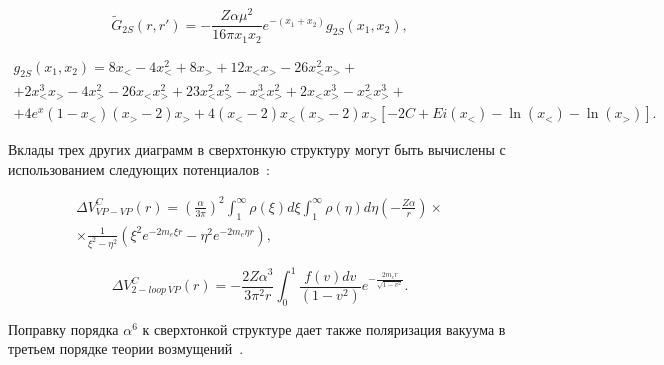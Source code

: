 \begin{equation}

\label{eq:green2s}

\tilde G_{2S}(r,r')=-\frac{Z\alpha\mu^2}{16\pi x_1x_2}e^{-(x_1+x_2)}g_{2S}(x_1,x_2),

\end{equation}

\begin{multline}

g_{2S}(x_1,x_2)=8x_{<}-4x^2_{<}+8x_{>}+12x_{<}x_{>}-26x^2_{<}x_{>}+ \\

+2x^3_{<}x_{>}-4x^2_{>}-

26x_{<}x^2_{>} +23x^2_{<}x^2_{>}-x^3_{<}x^2_{>}+2x_{<}x^3_{>}-x^2_{<}x^3_{>}+

\\

+

4e^x(1-x_{<})(x_{>}-2)x_{>}+4(x_{<}-2)x_{<}(x_{>}-2)

 x_{>}[-2C+Ei(x_{<})-\ln(x_{<})-\ln(x_{>})].

\end{multline}

Вклады трех других диаграмм в сверхтонкую структуру могут быть вычислены с использованием следующих потенциалов~\cite{apm2007}:

\begin{multline}

\label{eq:31}

\Delta V^C_{VP-VP}(r)=\left(\frac{\alpha}{3\pi}\right)^2\int_1^\infty

\rho(\xi)d\xi\int_1^\infty\rho(\eta)d\eta\left(-\frac{Z\alpha}{r}\right)

\times

\\

\times\frac{1}{\xi^2-\eta^2}\left(\xi^2 e^{-2m_e\xi r}-\eta^2 e^{-2m_e\eta r}\right),

\end{multline}

\begin{equation}

\label{eq:32}

\Delta V^C_{2-loop~VP}(r)=-\frac{2Z\alpha^3}{3\pi^2 r}\int_0^1\frac{f(v)dv}{(1-v^2)}

e^{-\frac{2m_e r}{\sqrt{1-v^2}}}.

\end{equation}

Поправку порядка $\alpha^6$ к сверхтонкой структуре дает также поляризация вакуума в третьем порядке теории возмущений~\cite{jetpletters2008}.



